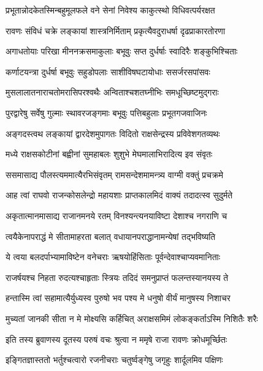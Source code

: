 \storymeta

\resetShloka



\twolineshloka
{प्रभूतान्नोदकेतस्मिन्बहुमूलफले वने}
{सेनां निवेश्य काकुत्स्थो विधिवत्पर्यरक्षत}


\twolineshloka
{रावणः संविधं चक्रे लङ्कायां शास्त्रनिर्मिताम्}
{प्रकृत्यैवदुराधर्षा दृढप्राकारतोरणा}


\twolineshloka
{अगाधतोयाः परिखा मीननक्रसमाकुलाः}
{बभूवुः सप्त दुर्धर्षाः स्वादिरैः शङ्कुभिश्चिताः}


\twolineshloka
{कर्णाटयन्त्रा दुर्धर्षा बभूवुः सहुडोपलाः}
{साशीविषघटायोधाः ससर्जरसपांसवः}


\twolineshloka
{मुसलालातनाराचतोमरासिपरश्वथैः}
{अन्विताश्चशतघ्नीभिः समधूच्छिष्टमुद्गराः}


\twolineshloka
{पुरद्वारेषु सर्वेषु गुल्माः स्थावरजङ्गमाः}
{बभूवुः पत्तिबहुलाः प्रभूतगजवाजिनः}


\twolineshloka
{अङ्गदस्त्वथ लङ्कायां द्वारदेशमुपागतः}
{विदितो राक्षसेन्द्रस्य प्रविवेशगतव्यथः}


\twolineshloka
{मध्ये राक्षसकोटीनां बह्वीनां सुमहाबलः}
{शुशुभे मेघमालाभिरादित्य इव संवृतः}


\twolineshloka
{ससमासाद्य पौलस्त्यममात्यैरभिसंवृतम्}
{रामसन्देशमामन्त्र्य वाग्मी वक्तुं प्रचक्रमे}


\twolineshloka
{आह त्वां राघवो राजन्कोसलेन्द्रो महायशाः}
{प्राप्तकालमिदं वाक्यं तदादत्स्व सुदुर्मते}


\twolineshloka
{अकृतात्मानमासाद्य राजानमनये रतम्}
{विनश्यन्त्यनयाविष्टा देशाश्च नगराणि च}


\twolineshloka
{त्वयैकेनापराद्धं मे सीतामाहरता बलात्}
{वधायानपराद्धानामन्येषां तद्भविष्यति}


\twolineshloka
{ये त्वया बलदर्पाभ्यामाविष्टेन वनेचराः}
{ऋषयोहिंसिताः पूर्वन्देवाश्चाप्यवमानिताः}


\twolineshloka
{राजर्षयश्च निहता रुदत्यश्चाहृताः स्त्रियः}
{तदिदं समनुप्राप्तं फलन्तस्यानयस्य ते}


\twolineshloka
{हन्तास्मि त्वां सहामात्यैर्युध्यस्व पुरुषो भव}
{पश्य मे धनुषो वीर्यं मानुषस्य निशाचर}


\twolineshloka
{मुच्यतां जानकी सीता न मे मोक्ष्यसि कर्हिचित्}
{अराक्षसमिमं लोकङ्कर्ताऽस्मि निशितैः शरैः}


\twolineshloka
{इति तस्य ब्रुवाणस्य दूतस्य परुषं वचः}
{श्रुत्वा न ममृषे राजा रावणः क्रोधमूर्च्छितः}


\twolineshloka
{इङ्गितज्ञास्ततो भर्तुश्चत्वारो रजनीचराः}
{चतुर्ष्वङ्गेषु जगृहुः शार्दूलमिव पक्षिणः}


